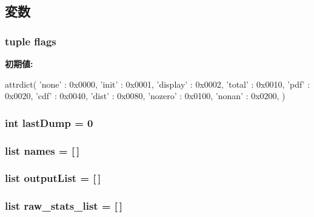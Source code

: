 \subsection{変数}
\hypertarget{namespacem5_1_1stats_a9ceb38153d5c0f156fbeada6dc00ff4f}{
\subsubsection[{flags}]{\setlength{\rightskip}{0pt plus 5cm}tuple {\bf flags}}}
\label{namespacem5_1_1stats_a9ceb38153d5c0f156fbeada6dc00ff4f}
{\bfseries 初期値:}
\begin{DoxyCode}
attrdict({
    'none'    : 0x0000,
    'init'    : 0x0001,
    'display' : 0x0002,
    'total'   : 0x0010,
    'pdf'     : 0x0020,
    'cdf'     : 0x0040,
    'dist'    : 0x0080,
    'nozero'  : 0x0100,
    'nonan'   : 0x0200,
})
\end{DoxyCode}
\hypertarget{namespacem5_1_1stats_a20e8a16c034e351837c23b9da8238d12}{
\subsubsection[{lastDump}]{\setlength{\rightskip}{0pt plus 5cm}int {\bf lastDump} = 0}}
\label{namespacem5_1_1stats_a20e8a16c034e351837c23b9da8238d12}
\hypertarget{namespacem5_1_1stats_a31c1745e8384111d62933080372a6861}{
\subsubsection[{names}]{\setlength{\rightskip}{0pt plus 5cm}list {\bf names} = \mbox{[}$\,$\mbox{]}}}
\label{namespacem5_1_1stats_a31c1745e8384111d62933080372a6861}
\hypertarget{namespacem5_1_1stats_a1cb3fc67d245c8981c09d7690290d8ae}{
\subsubsection[{outputList}]{\setlength{\rightskip}{0pt plus 5cm}list {\bf outputList} = \mbox{[}$\,$\mbox{]}}}
\label{namespacem5_1_1stats_a1cb3fc67d245c8981c09d7690290d8ae}
\hypertarget{namespacem5_1_1stats_a171a8d9605eaa8eaa190ac8942d74def}{
\subsubsection[{raw\_\-stats\_\-list}]{\setlength{\rightskip}{0pt plus 5cm}list {\bf raw\_\-stats\_\-list} = \mbox{[}$\,$\mbox{]}}}
